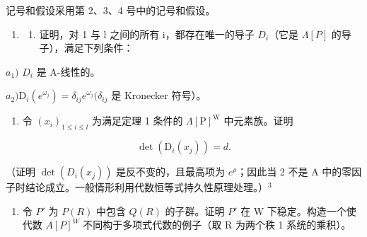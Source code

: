 
记号和假设采用第 2、3、4 号中的记号和假设。

\begin{enumerate}
\def\labelenumi{\arabic{enumi})}
\tightlist
\item
  \begin{enumerate}
  \def\labelenumii{\alph{enumii})}
  \tightlist
  \item
    证明，对 1 与 l 之间的所有 i，都存在唯一的导子 \(D_{i}\)（它是 \(\Lambda[P]\) 的导子），满足下列条件：
  \end{enumerate}
\end{enumerate}

\(a_{1})\) \(D_{i}\) 是 A-线性的。

\(a_{2})\mathrm{D}_{i}(e^{\omega_{j}}) = \delta_{ij}e^{\omega_{j}}(\delta_{ij}\) 是 Kronecker 符号）。

\begin{enumerate}
\def\labelenumi{\alph{enumi})}
\setcounter{enumi}{1}
\tightlist
\item
  令 \((x_{i})_{1\leqslant i\leqslant l}\) 为满足定理 1 条件的 \(\Lambda [\mathrm{P}]^{\mathrm{W}}\) 中元素族。证明
\end{enumerate}

\[
\det \left(\mathrm{D} _ {i} (x _ {j})\right) = d.
\]

（证明 \(\det(D_{i}(x_{j}))\) 是反不变的，且最高项为 \(e^{\rho}\)；因此当 2 不是 A 中的零因子时结论成立。一般情形利用代数恒等式持久性原理处理。）\(^{3}\)

\begin{enumerate}
\def\labelenumi{\arabic{enumi})}
\setcounter{enumi}{1}
\tightlist
\item
  令 \(P'\) 为 \(P(R)\) 中包含 \(Q(R)\) 的子群。证明 \(P'\) 在 W 下稳定。构造一个使代数 \(A[P]^{W}\) 不同构于多项式代数的例子（取 R 为两个秩 1 系统的乘积）。
\end{enumerate}

